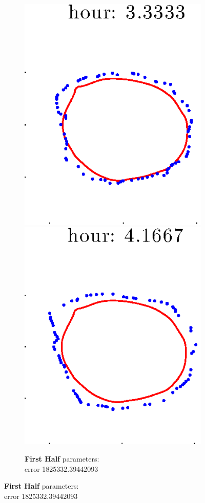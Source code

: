 \documentclass[12pt]{article}
\begin{document}
\begin{figure}[h!]
\begin{subfigure}[b]{.3\textwidth}
		\includegraphics[height=.15\textheight]{Pos10exp2/secondhalf/first5.eps}
		\includegraphics[height=.15\textheight]{Pos10exp2/secondhalf/first6.eps}
		\caption{\textbf{First Half} parameters: \\error 1825332.39442093}

\end{subfigure}
\end{figure}
\end{document}
